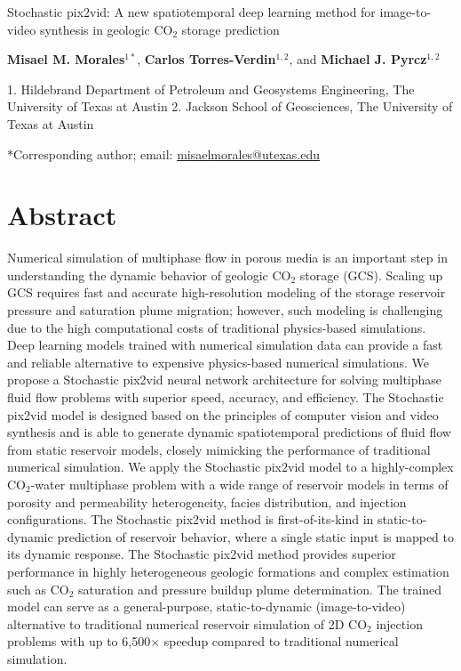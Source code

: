 \documentclass[10pt, twoside]{article}
\begin{document}
\doublespacing

\begin{center}
    {\huge Stochastic pix2vid: A new spatiotemporal deep learning method for image-to-video synthesis in geologic CO$_2$ storage prediction}
    \vspace{5mm}
    
    \textbf{Misael M. Morales$^{1*}$}, 
    \textbf{Carlos Torres-Verdin$^{1,2}$}, and
    \textbf{Michael J. Pyrcz$^{1,2}$}
\end{center}

\begin{flushleft}
    1. Hildebrand Department of Petroleum and Geosystems Engineering, The University of Texas at Austin
    2. Jackson School of Geosciences, The University of Texas at Austin
    
    *Corresponding author; email: \url{misaelmorales@utexas.edu}
\end{flushleft}

\section*{\textbf{Abstract}}
Numerical simulation of multiphase flow in porous media is an important step in understanding the dynamic behavior of geologic CO$_2$ storage (GCS). Scaling up GCS requires fast and accurate high-resolution modeling of the storage reservoir pressure and saturation plume migration; however, such modeling is challenging due to the high computational costs of traditional physics-based simulations. Deep learning models trained with numerical simulation data can provide a fast and reliable alternative to expensive physics-based numerical simulations. We propose a Stochastic pix2vid neural network architecture for solving multiphase fluid flow problems with superior speed, accuracy, and efficiency. The Stochastic pix2vid model is designed based on the principles of computer vision and video synthesis and is able to generate dynamic spatiotemporal predictions of fluid flow from static reservoir models, closely mimicking the performance of traditional numerical simulation. We apply the Stochastic pix2vid model to a highly-complex CO$_2$-water multiphase problem with a wide range of reservoir models in terms of porosity and permeability heterogeneity, facies distribution, and injection configurations. The Stochastic pix2vid method is first-of-its-kind in static-to-dynamic prediction of reservoir behavior, where a single static input is mapped to its dynamic response. The Stochastic pix2vid method provides superior performance in highly heterogeneous geologic formations and complex estimation such as CO$_2$ saturation and pressure buildup plume determination. The trained model can serve as a general-purpose, static-to-dynamic (image-to-video) alternative to traditional numerical reservoir simulation of 2D CO$_2$ injection problems with up to 6,500$\times$ speedup compared to traditional numerical simulation.
\end{document}
